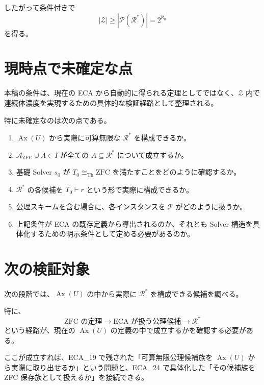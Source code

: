 \documentclass[a4paper,11pt]{article}
\begin{document}
したがって条件付きで
\[
|\mathcal{Z}|
\ge
|\mathcal{P}(\mathcal{R}^*)|
=
2^{\aleph_0}
\]
を得る。

\section{現時点で未確定な点}

本稿の条件は、現在の ECA から自動的に得られる定理としてではなく、$\mathcal{Z}$ 内で連続体濃度を実現するための具体的な検証経路として整理される。

特に未確定なのは次の点である。

\begin{enumerate}
\item $\operatorname{Ax}(U)$ から実際に可算無限な $\mathcal{R}^*$ を構成できるか。
\item $\mathcal{A}_{\mathrm{ZFC}}\cup A\in I$ が全ての $A\subseteq\mathcal{R}^*$ について成立するか。
\item 基礎 Solver $s_0$ が $T_0\cong_{\mathrm{Th}}\mathrm{ZFC}$ を満たすことをどのように確認するか。
\item $\mathcal{R}^*$ の各候補を $T_0\vdash r$ という形で実際に構成できるか。
\item 公理スキームを含む場合に、各インスタンスを $\mathcal{T}$ がどのように扱うか。
\item 上記条件が ECA の既存定義から導出されるのか、それとも Solver 構造を具体化するための明示条件として定める必要があるのか。
\end{enumerate}

\section{次の検証対象}

次の段階では、$\operatorname{Ax}(U)$ の中から実際に $\mathcal{R}^*$ を構成できる候補を調べる。

特に、
\[
\text{ZFC の定理}
\longrightarrow
\text{ECA が扱う公理候補}
\longrightarrow
\mathcal{R}^*
\]
という経路が、現在の
$\operatorname{Ax}(U)$ の定義の中で成立するかを確認する必要がある。

ここが成立すれば、ECA_19 で残された「可算無限公理候補族を $\operatorname{Ax}(U)$ から実際に取り出せるか」という問題と、ECA_24 で具体化した「その候補族を ZFC 保存族として扱えるか」を接続できる。
\end{document}
